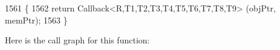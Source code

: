 \begin{DoxyCode}
1561                                                                                                            
      \{
1562   \textcolor{keywordflow}{return} Callback<R,T1,T2,T3,T4,T5,T6,T7,T8,T9> (objPtr, memPtr);
1563 \}
\end{DoxyCode}


Here is the call graph for this function\+:


